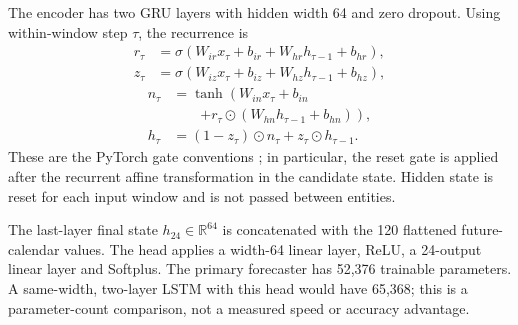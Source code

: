 \documentclass[pdflatex,iicol,sn-mathphys-num]{sn-jnl}
\begin{document}
The encoder has two GRU layers with hidden width 64 and zero dropout. Using within-window step $\tau$, the recurrence is
\begingroup\small
\begin{equation}\begin{aligned}
r_\tau&=\sigma(W_{ir}x_\tau+b_{ir}+W_{hr}h_{\tau-1}+b_{hr}),\\
z_\tau&=\sigma(W_{iz}x_\tau+b_{iz}+W_{hz}h_{\tau-1}+b_{hz}),
\end{aligned}\label{eq:gates}\end{equation}
\endgroup
\begin{equation}\begin{aligned}
n_\tau&=\tanh\!\left(W_{in}x_\tau+b_{in}\right.\\
&\qquad\left.+r_\tau\odot(W_{hn}h_{\tau-1}+b_{hn})\right),\\
h_\tau&=(1-z_\tau)\odot n_\tau+z_\tau\odot h_{\tau-1}.
\end{aligned}\label{eq:hidden}\end{equation}
These are the PyTorch gate conventions \cite{pytorch211}; in particular, the reset gate is applied after the recurrent affine transformation in the candidate state. Hidden state is reset for each input window and is not passed between entities.

The last-layer final state $h_{24}\in\mathbb R^{64}$ is concatenated with the 120 flattened future-calendar values. The head applies a width-64 linear layer, ReLU, a 24-output linear layer and Softplus. The primary forecaster has 52,376 trainable parameters. A same-width, two-layer LSTM with this head would have 65,368; this is a parameter-count comparison, not a measured speed or accuracy advantage.
\end{document}
